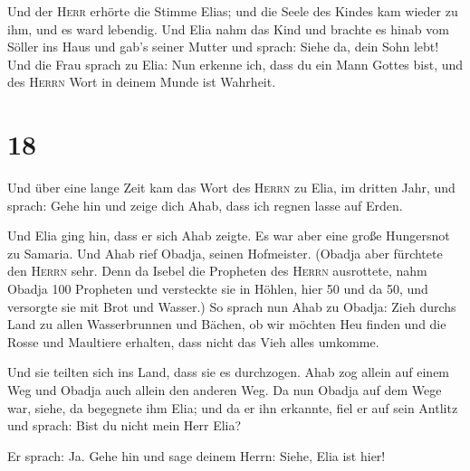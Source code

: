  Und der \textsc{Herr} erhörte die Stimme Elias; und die
Seele des Kindes kam wieder zu ihm, und es ward lebendig.
 Und Elia nahm das Kind und brachte es hinab vom Söller
ins Haus und gab's seiner Mutter und sprach: Siehe da, dein Sohn lebt!
 Und die Frau sprach zu Elia: Nun erkenne ich, dass du
ein Mann Gottes bist, und des \textsc{Herrn} Wort in deinem Munde ist
Wahrheit.

\hypertarget{section-17}{%
\section{18}\label{section-17}}

 Und über eine lange Zeit kam das Wort des \textsc{Herrn}
zu Elia, im dritten Jahr, und sprach: Gehe hin und zeige dich Ahab, dass
ich regnen lasse auf Erden.

 Und Elia ging hin, dass er sich Ahab zeigte. Es war aber
eine große Hungersnot zu Samaria.  Und Ahab rief Obadja,
seinen Hofmeister. (Obadja aber fürchtete den \textsc{Herrn} sehr.
 Denn da Isebel die Propheten des \textsc{Herrn}
ausrottete, nahm Obadja 100 Propheten und versteckte sie in Höhlen, hier
50 und da 50, und versorgte sie mit Brot und Wasser.)  So
sprach nun Ahab zu Obadja: Zieh durchs Land zu allen Wasserbrunnen und
Bächen, ob wir möchten Heu finden und die Rosse und Maultiere erhalten,
dass nicht das Vieh alles umkomme.

 Und sie teilten sich ins Land, dass sie es durchzogen.
Ahab zog allein auf einem Weg und Obadja auch allein den anderen Weg.
 Da nun Obadja auf dem Wege war, siehe, da begegnete ihm
Elia; und da er ihn erkannte, fiel er auf sein Antlitz und sprach: Bist
du nicht mein Herr Elia?

 Er sprach: Ja. Gehe hin und sage deinem Herrn: Siehe,
Elia ist hier!

